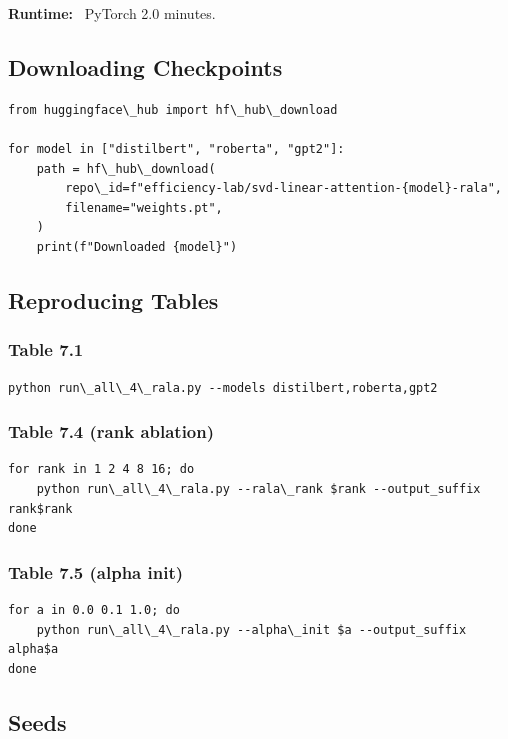 \textbf{Runtime:} ~PyTorch 2.0 minutes.

\subsection{Downloading Checkpoints}

\begin{lstlisting}
from huggingface\_hub import hf\_hub\_download

for model in ["distilbert", "roberta", "gpt2"]:
    path = hf\_hub\_download(
        repo\_id=f"efficiency-lab/svd-linear-attention-{model}-rala",
        filename="weights.pt",
    )
    print(f"Downloaded {model}")
\end{lstlisting}

\subsection{Reproducing Tables}

\subsubsection{Table 7.1}

\begin{lstlisting}
python run\_all\_4\_rala.py --models distilbert,roberta,gpt2
\end{lstlisting}

\subsubsection{Table 7.4 (rank ablation)}

\begin{lstlisting}
for rank in 1 2 4 8 16; do
    python run\_all\_4\_rala.py --rala\_rank $rank --output_suffix rank$rank
done
\end{lstlisting}

\subsubsection{Table 7.5 (alpha init)}

\begin{lstlisting}
for a in 0.0 0.1 1.0; do
    python run\_all\_4\_rala.py --alpha\_init $a --output_suffix alpha$a
done
\end{lstlisting}

\subsection{Seeds}


